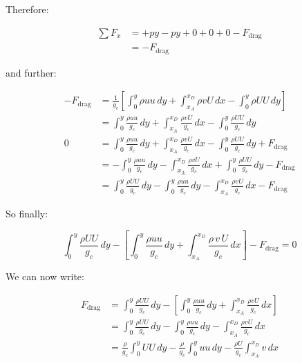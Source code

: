 \documentclass[letterpaper,12pt]{article}
\begin{document}
Therefore:

\begin{equation}
\begin{aligned}
    \sum F_x &= +py-py+0+0+0-F_{\text{drag}} \\
             &= -F_{\text{drag}}
\end{aligned}
\end{equation}

and further:

\begin{equation}
\begin{aligned}
    -F_{\text{drag}} &= \frac{1}{g_c}\left[\int_0^y\rho uu\,dy+\int_{x_A}^{x_D}\rho vU\,dx-\int_0^y\rho UU\,dy\right] \\
                     &=\int_0^y\frac{\rho uu}{g_c}\,dy+\int_{x_A}^{x_D}\frac{\rho vU}{g_c}\, dx-\int_0^y\frac{\rho UU}{g_c}\,dy\\
    0                &=\int_0^y\frac{\rho uu}{g_c}\,dy+\int_{x_A}^{x_D}\frac{\rho vU}{g_c}\,dx-\int_0^y\frac{\rho UU}{g_c}\,dy+F_{\text{drag}} \\
                     &= -\int_0^y\frac{\rho uu}{g_c}\,dy-\int_{x_A}^{x_D}\frac{\rho vU}{g_c}\,dx+\int_0^y\frac{\rho UU}{g_c}\,dy-F_{\text{drag}} \\
                     &= \int_0^y\frac{\rho UU}{g_c}\,dy-\int_0^y\frac{\rho uu}{g_c}\,dy-\int_{x_A}^{x_D}\frac{\rho vU}{g_c}\,dx-F_{\text{drag}}
\end{aligned}
\end{equation}

So finally:

\begin{equation}
\boxed{
    \int_0^y\frac{\rho UU}{g_c}\,dy-\left[\int_0^y\frac{\rho uu}{g_c}\,dy+\int_{x_A}^{x_D}\frac{\rho\,v\,U}{g_c}\,dx\right]-F_{\text{drag}} = 0
}
\end{equation}

We can now write:

\begin{equation}
\begin{aligned}
    F_{\text{drag}} &= \int_0^y\frac{\rho UU}{g_c}\,dy-\left[\int_0^y\frac{\rho uu}{g_c}\,dy+\int_{x_A}^{x_D}\frac{\rho vU}{g_c}\,dx\right] \\
                    &= \int_0^y\frac{\rho UU}{g_c}\,dy-\int_0^y\frac{\rho uu}{g_c}\,dy-\int_{x_A}^{x_D}\frac{\rho vU}{g_c}\,dx \\
                    &= \frac{\rho}{g_c}\int_0^y UU\,dy-\frac{\rho}{g_c}\int_0^y uu\,dy-\frac{\rho U}{g_c}\int_{x_A}^{x_D}v\,dx
\end{aligned}
\end{equation}
\end{document}
